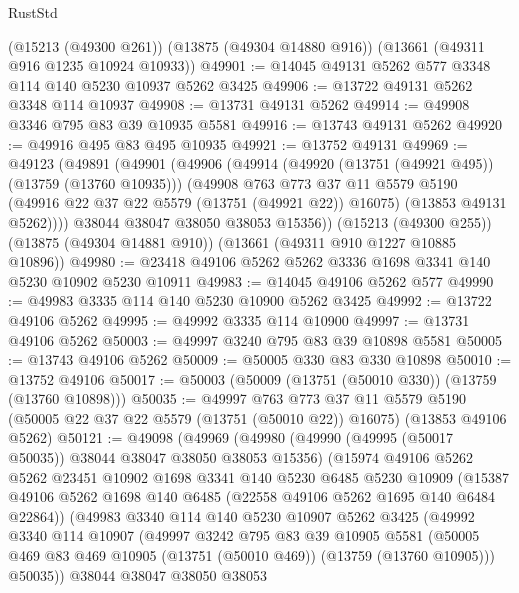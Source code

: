 \begin{lexlean}{RustStd}
\begin{coremodule}
    (@15213 (@49300 @261))
    (@13875 (@49304 @14880 @916))
    (@13661 (@49311 @916 @1235 @10924 @10933))
@49901 := @14045 @49131 @5262 @577 @3348 @114 @140 @5230 @10937 @5262 @3425
@49906 := @13722 @49131 @5262 @3348 @114 @10937
@49908 := @13731 @49131 @5262
@49914 := @49908 @3346 @795 @83 @39 @10935 @5581
@49916 := @13743 @49131 @5262
@49920 := @49916 @495 @83 @495 @10935
@49921 := @13752 @49131
@49969 := @49123
    (@49891
      (@49901
        (@49906
          (@49914
            (@49920 (@13751 (@49921 @495)) (@13759 (@13760 @10935)))
            (@49908
              @763
              @773
              @37
              @11
              @5579
              @5190
              (@49916 @22 @37 @22 @5579 (@13751 (@49921 @22)) @16075)
              (@13853 @49131 @5262))))
        @38044
        @38047
        @38050
        @38053
        @15356))
    (@15213 (@49300 @255))
    (@13875 (@49304 @14881 @910))
    (@13661 (@49311 @910 @1227 @10885 @10896))
@49980 := @23418 @49106 @5262 @5262 @3336 @1698 @3341 @140 @5230 @10902 @5230 @10911
@49983 := @14045 @49106 @5262 @577
@49990 := @49983 @3335 @114 @140 @5230 @10900 @5262 @3425
@49992 := @13722 @49106 @5262
@49995 := @49992 @3335 @114 @10900
@49997 := @13731 @49106 @5262
@50003 := @49997 @3240 @795 @83 @39 @10898 @5581
@50005 := @13743 @49106 @5262
@50009 := @50005 @330 @83 @330 @10898
@50010 := @13752 @49106
@50017 := @50003 (@50009 (@13751 (@50010 @330)) (@13759 (@13760 @10898)))
@50035 := @49997
    @763
    @773
    @37
    @11
    @5579
    @5190
    (@50005 @22 @37 @22 @5579 (@13751 (@50010 @22)) @16075)
    (@13853 @49106 @5262)
@50121 := @49098
    (@49969
      (@49980
        (@49990 (@49995 (@50017 @50035)) @38044 @38047 @38050 @38053 @15356)
        (@15974
          @49106
          @5262
          @5262
          @23451
          @10902
          @1698
          @3341
          @140
          @5230
          @6485
          @5230
          @10909
          (@15387 @49106 @5262 @1698 @140 @6485 (@22558 @49106 @5262 @1695 @140 @6484 @22864))
          (@49983
            @3340
            @114
            @140
            @5230
            @10907
            @5262
            @3425
            (@49992
              @3340
              @114
              @10907
              (@49997
                @3242
                @795
                @83
                @39
                @10905
                @5581
                (@50005 @469 @83 @469 @10905 (@13751 (@50010 @469)) (@13759 (@13760 @10905)))
                @50035))
            @38044
            @38047
            @38050
            @38053

\end{coremodule}
\end{lexlean}
